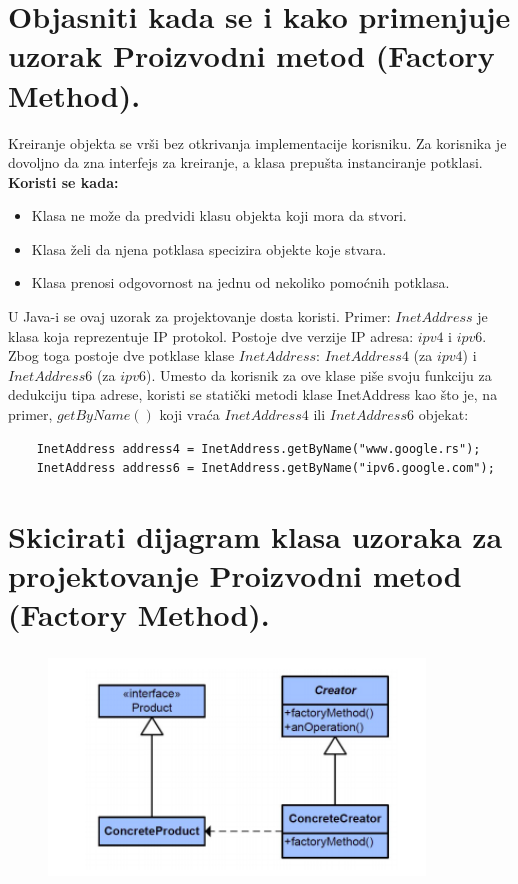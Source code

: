 \documentclass[a4paper]{article}
\begin{document}
\section{Objasniti kada se i kako primenjuje uzorak Proizvodni metod (Factory Method).}
  Kreiranje objekta se vrši bez otkrivanja implementacije korisniku. Za korisnika je dovoljno
  da zna interfejs za kreiranje, a klasa prepušta instanciranje potklasi. \\
  \textbf{Koristi se kada:}
  \begin{itemize}
    \item Klasa ne može da predvidi klasu objekta koji mora da stvori.
    \item Klasa želi da njena potklasa specizira objekte koje stvara.
    \item Klasa prenosi odgovornost na jednu od nekoliko pomoćnih potklasa.
  \end{itemize}

  \indent U Java-i se ovaj uzorak za projektovanje dosta koristi. Primer: $InetAddress$ je klasa koja
  reprezentuje IP protokol. Postoje dve verzije IP adresa: $ipv4$ i $ipv6$. Zbog toga postoje
  dve potklase klase $InetAddress$: $InetAddress4$ (za $ipv4$) i $InetAddress6$ (za $ipv6$). Umesto
  da korisnik za ove klase piše svoju funkciju za dedukciju tipa adrese, koristi se 
  statički metodi klase InetAddress kao što je, na primer, $getByName()$ koji vraća $InetAddress4$
  ili $InetAddress6$ objekat:
  \begin{lstlisting}
    InetAddress address4 = InetAddress.getByName("www.google.rs");
    InetAddress address6 = InetAddress.getByName("ipv6.google.com");\end{lstlisting}

\section{Skicirati dijagram klasa uzoraka za projektovanje Proizvodni metod (Factory Method).}
  \begin{figure}[H]
    \begin{center}
        \includegraphics[width=100mm,height=60mm]{Slike/dp_factory_method.png}
    \end{center}
  \end{figure} 
\end{document}
